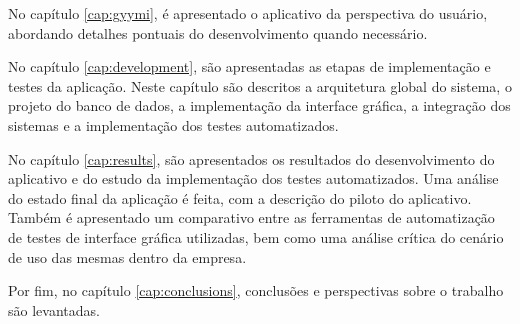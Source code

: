 No capítulo \ref{cap:gyymi}, é apresentado o aplicativo da perspectiva do usuário, abordando detalhes pontuais do desenvolvimento quando necessário.


No capítulo \ref{cap:development}, são apresentadas as etapas de implementação e testes da aplicação. Neste capítulo são descritos a arquitetura global do sistema, o projeto do banco de dados, a implementação da interface gráfica, a integração dos sistemas e a implementação dos testes automatizados.

No capítulo \ref{cap:results}, são apresentados os resultados do desenvolvimento do aplicativo e do estudo da implementação dos testes automatizados. Uma análise do estado final da aplicação é feita, com a descrição do piloto do aplicativo. Também é apresentado um comparativo entre as ferramentas de automatização de testes de interface gráfica utilizadas, bem como uma análise crítica do cenário de uso das mesmas dentro da empresa.

Por fim, no capítulo \ref{cap:conclusions}, conclusões e perspectivas sobre o trabalho são levantadas.
